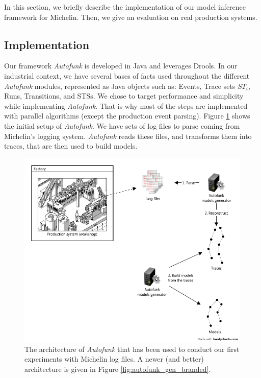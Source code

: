 In this section, we briefly describe the implementation of our
model inference framework for Michelin. Then, we give an
evaluation on real production systems.

\subsection{Implementation}
\label{sec:impl-exp-collect}

Our framework \textit{Autofunk} is developed in Java and leverages Drools.
In our industrial context, we have several bases of facts used
throughout the different \textit{Autofunk} modules, represented as Java
objects such as: Events, Trace sets $ST_i$, Runs, Transitions,
and STSs. We chose to target performance and simplicity while
implementing \textit{Autofunk}. That is why most of the steps are
implemented with parallel algorithms (except the production event
parsing). Figure \ref{fig:autofunk_initial_setup} shows the
initial setup of \textit{Autofunk}. We have sets of log files to parse
coming from Michelin's logging system. \textit{Autofunk} reads these
files, and transforms them into traces, that are then used to
build models.

\begin{figure}[ht]
    \includegraphics[width=1.0\linewidth]{figures/autofunk_initial_setup.png}

    \caption{The architecture of \textit{Autofunk} that has been
        used to conduct our first experiments with Michelin log
        files. A newer (and better) architecture is given in
        Figure \ref{fig:autofunk_gen_branded}.}
    \label{fig:autofunk_initial_setup}
\end{figure}

